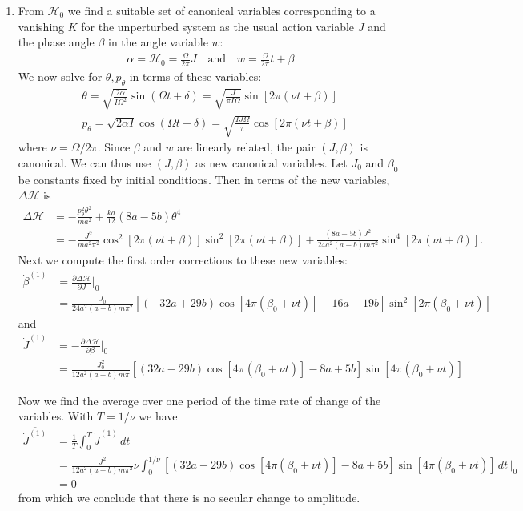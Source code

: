 \documentclass{article}
\theoremstyle{definition}
\newcommand{\p}{\partial}
\newcommand{\ham}{\mathcal{H}}
\newcommand{\al}{\alpha}
\newcommand{\be}{\beta}
\newcommand{\f}[2]{\frac{#1}{#2}}
\begin{document}
\begin{enumerate}[label=(\alph*)]
	
	
	\item From $\ham_0$ we find a suitable set of canonical variables corresponding to a vanishing $K$ for the unperturbed system as the usual action variable $J$ and the phase angle $\be$ in the angle variable $w$:
	\begin{align*}
	\al = \ham_0 = \f{\Omega}{2\pi} J \quad\text{and}\quad
	w = \f{\Omega}{2\pi} t + \be
	\end{align*}
	We now solve for $\theta, p_\theta$ in terms of these variables:
	\begin{align*}
	&\theta = \sqrt{\f{2\al}{I \Omega^2 }} \sin(\Omega t + \delta) = \sqrt{\f{J}{\pi I \Omega}} \sin[2\pi(\nu t + \be)]\\
	&p_\theta = \sqrt{2\al I }\cos(\Omega t + \delta) = \sqrt{\f{I J \Omega}{\pi}}\cos[2\pi(\nu t + \be)]
	\end{align*}
	where $\nu = \Omega/2\pi$. Since $\be$ and $w$ are linearly related, the pair $(J,\be)$ is canonical. We can thus use $(J,\be)$ as new canonical variables. Let $J_0$ and $\be_0$ be constants fixed by initial conditions. Then in terms of the new variables, $\Delta \ham$ is 
	\begin{align*}
	\Delta \ham 
	&= -\f{p_\theta^2\theta^2}{ma^2} + \f{ka}{12}(8a - 5b) \theta^4 \\
	&= -\f{J^2}{ma^2\pi^2} \cos^2[2\pi(\nu t + \be)] \sin^2[2\pi(\nu t + \be)] + \f{(8a-5b)J^2}{24 a^2(a-b)m\pi^2}   \sin^4[2\pi(\nu t + \be)].
	\end{align*}
	Next we compute the first order corrections to these new variables:
	\begin{align*}
	\dot\be^{(1)} &= \f{\p \Delta \ham}{\p J}\bigg\vert_0 \\
	&=  \frac{J_0  }{24  a^2 (a-b) m \pi^2} [(-32 a + 29 b) \cos [4 \pi  (\beta_0 +\nu  t)] - 16 a + 19
	b] \sin ^2[2 \pi  (\beta_0 +\nu  t)] 
	\end{align*}
	and 
	\begin{align*}
	\dot J^{(1)}&= -\f{\p \Delta \ham}{\p \be}\bigg\vert_0  \\
	&=\frac{J_0^2  }{12  a^2 (a-b) m \pi} 
	[(32 a - 29b) \cos [4 \pi  (\beta_0 +\nu  t)] -8 a+5
	b] \sin [4 \pi  (\beta_0 +\nu  t)]
	\end{align*}
	
	Now we find the average over one period of the time rate of change of the variables. With $T=1/\nu$ we have
	\begin{align*}
	\overline{\dot{J}^{(1)}} 
	&= \f{1}{T}\int^T_0 \dot J^{(1)}\,dt \\
	&= \frac{J^2  }{12   a^2  (a-b) m\pi^2}  \nu \int^{1/\nu}_0 	[(32 a - 29b) \cos [4 \pi  (\beta_0 +\nu  t)] -8 a+5
	b] \sin [4 \pi  (\beta_0 +\nu  t)]\,dt\,\bigg\vert_0 \\
	&= \boxed{0}
	\end{align*}
	from which we conclude that there is no secular change to amplitude. 
	

\end{enumerate}
\end{document}
